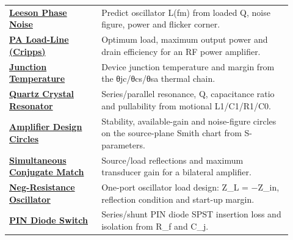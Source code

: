 \begin{longtable}{>{\raggedright\arraybackslash}p{0.30\linewidth}>{\raggedright\arraybackslash}p{0.62\linewidth}}
\href{https://rftoolbox.ca/LeesonPhaseNoise.html}{\textbf{Leeson Phase Noise}} & Predict oscillator L(fm) from loaded Q, noise figure, power and flicker corner. \\
\href{https://rftoolbox.ca/PALoadLine.html}{\textbf{PA Load-Line (Cripps)}} & Optimum load, maximum output power and drain efficiency for an RF power amplifier. \\
\href{https://rftoolbox.ca/JunctionTemp.html}{\textbf{Junction Temperature}} & Device junction temperature and margin from the θjc/θcs/θsa thermal chain. \\
\href{https://rftoolbox.ca/CrystalResonator.html}{\textbf{Quartz Crystal Resonator}} & Series/parallel resonance, Q, capacitance ratio and pullability from motional L1/C1/R1/C0. \\
\href{https://rftoolbox.ca/AmpDesignCircles.html}{\textbf{Amplifier Design Circles}} & Stability, available-gain and noise-figure circles on the source-plane Smith chart from S-parameters. \\
\href{https://rftoolbox.ca/ConjugateMatch.html}{\textbf{Simultaneous Conjugate Match}} & Source/load reflections and maximum transducer gain for a bilateral amplifier. \\
\href{https://rftoolbox.ca/NegResOscillator.html}{\textbf{Neg-Resistance Oscillator}} & One-port oscillator load design: Z\_L = −Z\_in, reflection condition and start-up margin. \\
\href{https://rftoolbox.ca/PINDiodeSwitch.html}{\textbf{PIN Diode Switch}} & Series/shunt PIN diode SPST insertion loss and isolation from R\_f and C\_j. \\
\hline
\end{longtable}

